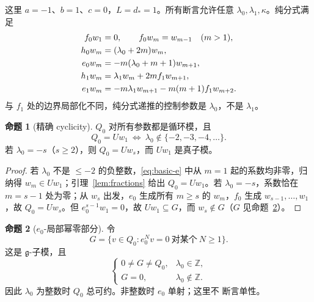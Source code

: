 \documentclass[UTF8,11pt]{ctexart}
\newcommand{\Z}{\mathbb Z}
\newcommand{\g}{\mathfrak g}
\theoremstyle{definition}
\newtheorem{proposition}{命题}[section]
\begin{document}
这里 \(a=-1\)、\(b=1\)、\(c=0\)，\(L=d_*=1\)。所有断言允许任意
\(\lambda_0,\lambda_1,\kappa\)。纯分式满足
\begin{align}
f_0w_1&=0,\qquad f_0w_m=w_{m-1}\quad(m>1),\notag\\
h_0w_m&=(\lambda_0+2m)w_m,\label{eq:basic}\\
e_0w_m&=-m(\lambda_0+m+1)w_{m+1},\label{eq:basic-e}\\
h_1w_m&=\lambda_1w_m+2mf_1w_{m+1},\notag\\
e_1w_m&=-m\lambda_1w_{m+1}-m(m+1)f_1w_{m+2}.\notag
\end{align}
与 \(f_1\) 处的边界局部化不同，纯分式递推的控制参数是 \(\lambda_0\)，不是
\(\lambda_1\)。

\begin{proposition}[精确 cyclicity]\label{prop:cyclic}
\(Q_0\) 对所有参数都是循环模，且
\[
Q_0=Uw_1\ \Longleftrightarrow\ \lambda_0\notin\{-2,-3,-4,\ldots\}.
\]
若 \(\lambda_0=-s\)（\(s\ge2\)），则 \(Q_0=Uw_s\)，而 \(Uw_1\) 是真子模。
\end{proposition}

\begin{proof}
若 \(\lambda_0\) 不是 \(\le-2\) 的负整数，\eqref{eq:basic-e} 中从 \(m=1\)
起的系数均非零，归纳得 \(w_m\in Uw_1\)；引理~\ref{lem:fractions} 给出
\(Q_0=Uw_1\)。若 \(\lambda_0=-s\)，系数恰在 \(m=s-1\) 处为零；从 \(w_s\)
出发，\(e_0\) 生成所有 \(m\ge s\) 的 \(w_m\)，\(f_0\) 生成
\(w_{s-1},\ldots,w_1\)，故 \(Q_0=Uw_s\)。但 \(e_0^{s-1}w_1=0\)，故
\(Uw_1\subseteq G\)，而 \(w_s\notin G\)（\(G\) 见命题~\ref{prop:integer}）。
\end{proof}

\begin{proposition}[\(e_0\)-局部幂零部分]\label{prop:integer}
令
\[
G=\{v\in Q_0:e_0^Nv=0\ \text{对某个}\ N\ge1\}.
\]
这是 \(\g\)-子模，且
\[
\begin{cases}
0\ne G\ne Q_0,&\lambda_0\in\Z,\\
G=0,&\lambda_0\notin\Z.
\end{cases}
\]
因此 \(\lambda_0\) 为整数时 \(Q_0\) 总可约。非整数时 \(e_0\) 单射；这里不
断言单性。
\end{proposition}
\end{document}
